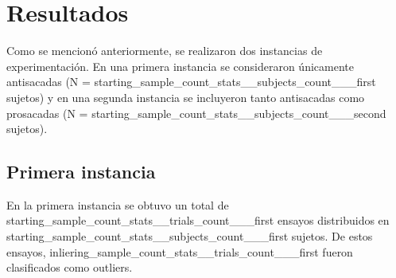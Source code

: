 \section{{Resultados}}

Como se mencionó anteriormente, se realizaron dos instancias de experimentación.
En una primera instancia se consideraron únicamente antisacadas (N =
{starting_sample_count_stats__subjects_count___first} sujetos) y en una segunda
instancia se incluyeron tanto antisacadas como prosacadas (N =
{starting_sample_count_stats__subjects_count___second} sujetos).

\subsection{{Primera instancia}}

En la primera instancia se obtuvo un total de
{starting_sample_count_stats__trials_count___first}
ensayos distribuidos en {starting_sample_count_stats__subjects_count___first}
sujetos.
De estos ensayos, {inliering_sample_count_stats__trials_count___first} fueron
clasificados como outliers.
